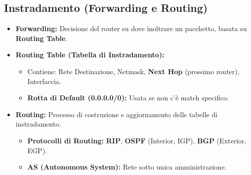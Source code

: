 \subsection{Instradamento (Forwarding e Routing)}
\begin{itemize}
    \item \textbf{Forwarding:} Decisione del router su dove inoltrare un pacchetto, basata su \textbf{Routing Table}.
    \item \textbf{Routing Table (Tabella di Instradamento):}
        \begin{itemize}
            \item Contiene: Rete Destinazione, Netmask, \textbf{Next Hop} (prossimo router), Interfaccia.
            \item \textbf{Rotta di Default (0.0.0.0/0):} Usata se non c'è match specifico.
        \end{itemize}
    \item \textbf{Routing:} Processo di costruzione e aggiornamento delle tabelle di instradamento.
        \begin{itemize}
            \item \textbf{Protocolli di Routing:} \textbf{RIP}, \textbf{OSPF} (Interior, IGP), \textbf{BGP} (Exterior, EGP).
            \item \textbf{AS (Autonomous System):} Rete sotto unica amministrazione.
        \end{itemize}
\end{itemize}

